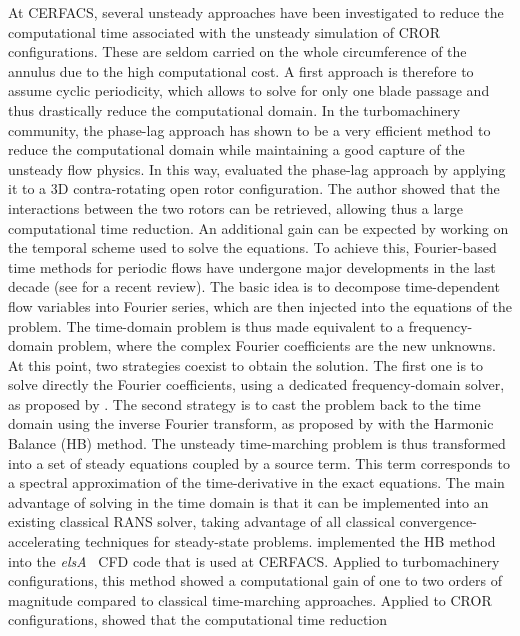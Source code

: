 At CERFACS, several unsteady approaches have been investigated 
to reduce the computational time associated with the unsteady simulation of 
CROR configurations. 
These are seldom carried on the whole
circumference of the annulus due to the high computational
cost. A first approach is therefore to assume cyclic periodicity,
which allows to solve for only one blade passage and thus drastically
reduce the computational domain. 
In the turbomachinery community, the phase-lag approach has shown to be
a very efficient method to reduce the computational domain while
maintaining a good capture of the unsteady flow physics. 
In this way, \citet{Burnazzi2010} evaluated the phase-lag approach
by applying it
to a 3D contra-rotating open rotor configuration. The author showed
that the interactions between the two rotors can be retrieved, allowing
thus a large computational time reduction.
An additional gain can be expected by working on
the temporal scheme used to solve the equations. 
To achieve
this, Fourier-based time methods for periodic flows have undergone major
developments in the last decade (see \citet{He2010} for a recent
review).  The basic idea is to decompose
time-dependent flow variables into Fourier series, which are then
injected into the equations of the problem. The time-domain problem is
thus made equivalent to a frequency-domain problem, where the complex
Fourier coefficients are the new unknowns. At this point, two
strategies coexist to obtain the solution. The first one is to solve
directly the Fourier coefficients, using a dedicated
frequency-domain solver, as proposed by \citet{He1998}. The second strategy is to cast the
problem back to the time domain using the inverse Fourier transform, as
proposed by \citet{Hall2002} with the Harmonic
Balance (HB) method. The unsteady time-marching problem is thus
transformed into a set of steady equations coupled by a source term.
This term corresponds to a spectral approximation of the 
time-derivative in the exact equations. 
The main advantage of solving in the time domain is
that it can be implemented into an existing classical RANS solver,
taking advantage of all classical convergence-accelerating techniques
for steady-state problems.
\citet{ThesisSicot} implemented
the HB method into the \textit{elsA}~\cite{Cambier2013} CFD code
that is used at CERFACS. Applied to turbomachinery
configurations, this method showed a computational gain
of one to two orders of magnitude 
compared to classical time-marching approaches.
Applied to CROR configurations, \citet{Yabili2010}
showed that the computational time reduction
